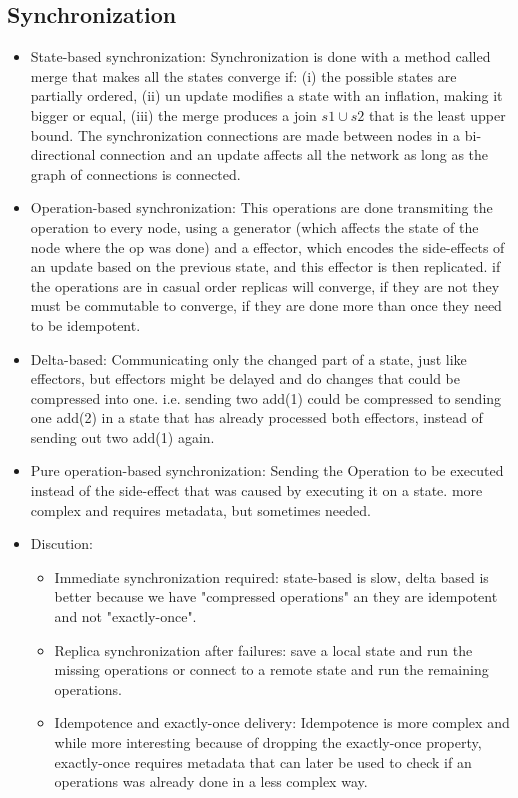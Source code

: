 \documentclass{article}
\begin{document}
\subsection{Synchronization}
\begin{itemize}
    \item State-based synchronization: Synchronization is done with a method called merge that makes all the states converge if: (i) the possible states are partially ordered, (ii) un update modifies a state with an inflation, making it bigger or equal, (iii) the merge produces a join $s1 \cup s2$ that is the least upper bound. The synchronization connections are made between nodes in a bi-directional connection and an update affects all the network as long as the graph of connections is connected.
    \item Operation-based synchronization: This operations are done transmiting the operation to every node, using a generator (which affects the state of the node where the op was done) and a effector, which encodes the side-effects of an update based on the previous state, and this effector is then replicated. if the operations are in casual order replicas will converge, if they are not they must be commutable to converge, if they are done more than once they need to be idempotent.
    \item Delta-based: Communicating only the changed part of a state, just like effectors, but effectors might be delayed and do changes that could be compressed into one. i.e. sending two add(1) could be compressed to sending one add(2) in a state that has already processed both effectors, instead of sending out two add(1) again.
    \item Pure operation-based synchronization: Sending the Operation to be executed instead of the side-effect that was caused by executing it on a state. more complex and requires metadata, but sometimes needed.
    \item Discution:
    \begin{itemize}
        \item Immediate synchronization required: state-based is slow, delta based is better because we have "compressed operations" an they are idempotent and not "exactly-once".
        \item Replica synchronization after failures: save a local state and run the missing operations or connect to a remote state and run the remaining operations.
        \item Idempotence and exactly-once delivery: Idempotence is more complex and while more interesting because of dropping the exactly-once property, exactly-once requires metadata that can later be used to check if an operations was already done in a less complex way.
    \end{itemize}
\end{itemize}
\end{document}
